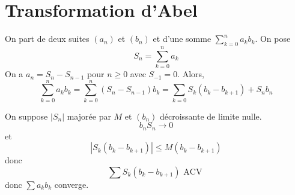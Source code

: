 \section{Transformation d'Abel}

On part de deux suites $(a_n)$ et $(b_n)$ et d'une somme $\displaystyle\sum_{k=0}^na_kb_k$. On pose \[
    S_n=\sum_{k=0}^na_k
\]
On a $a_n=S_n-S_{n-1}$ pour $n\geq 0$ avec $S_{-1}=0$. Alors, \[
    \sum_{k=0}^na_kb_k=\sum_{k=0}^n(S_n-S_{n-1})b_k=\sum_{k=0}S_k(b_k-b_{k+1})+S_n b_n
\]

\begin{ex}
    On suppose $|S_n|$ majorée par $M$ et $(b_n)$ décroissante de limite nulle. \[
        b_nS_n\longrightarrow0
    \]
    et \[
        |S_k(b_k-b_{k+1})|\leq M(b_k-b_{k+1})
    \]
    donc \[
        \sum S_k(b_k-b_{k+1})\text{ ACV }
    \]
    donc $\sum a_kb_k$ converge.
\end{ex}


